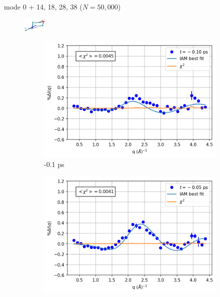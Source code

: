 \documentclass{beamer}
\newcommand\w{0.32}
\begin{document}
\begin{frame}{mode 0 + 14, 18, 28, 38 ($N=50{,}000$)}
	\vspace{-4mm}
	\begin{figure}
		\centering
		\includegraphics[width=0.1\textwidth]{mode0_ot.png}
	\end{figure}
\vspace{-5mm}
	\begin{figure}
		\centering
		\begin{subfigure}[b]{\w\textwidth}
			\centering
			\includegraphics[width=\textwidth]{figures/20000_0+vstrongmodes_-0.10.png}
			\caption{-0.1 ps}
		\end{subfigure}
		\begin{subfigure}[b]{\w\textwidth}
			\centering
			\includegraphics[width=\textwidth]{figures/20000_0+vstrongmodes_-0.05.png}

\end{subfigure}
\end{figure}
\end{frame}
\end{document}
